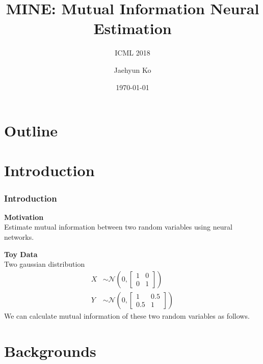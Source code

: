 \documentclass[aspectratio=169]{beamer}
\begin{document}
\begin{frame}
	\title{MINE: Mutual Information Neural Estimation}
	\subtitle{ICML 2018}
	\author{Jaehyun Ko}
	\date{\today}
	\titlepage
\end{frame}


\section*{Outline}
\begin{frame}
\tableofcontents
\end{frame}



\section{Introduction}
\begin{frame}
	\frametitle{Introduction}
	\textbf{Motivation} \\ Estimate mutual information between two random variables using neural networks. \\
\end{frame}

\begin{frame}
	\textbf{Toy Data} \\ Two gaussian distribution
	\begin{align*}
		X &\sim \mathcal{N}(0,
		\begin{bmatrix}
			1 & 0 \\
			0 & 1
		\end{bmatrix})\\
		Y &\sim \mathcal{N}(0, 
		\begin{bmatrix}
			1 & 0.5 \\
			0.5 & 1
		\end{bmatrix})
	\end{align*}
	We can calculate mutual information of these two random variables as follows.
\end{frame}

\section{Backgrounds}
\end{document}
